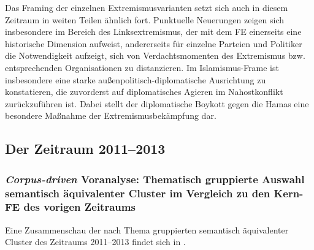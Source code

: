 Das Framing der einzelnen Extremismusvarianten setzt sich auch in diesem Zeitraum in weiten Teilen ähnlich fort. Punktuelle Neuerungen zeigen sich insbesondere im Bereich des Linksextremismus, der mit dem FE  einerseits eine historische Dimension aufweist, andererseits für einzelne Parteien und Politiker die Notwendigkeit aufzeigt, sich von Verdachtsmomenten des Extremismus bzw. entsprechenden Organisationen zu distanzieren. Im Islamismus-Frame ist insbesondere eine starke außenpolitisch-diplomatische Ausrichtung zu konstatieren, die zuvorderst auf diplomatisches Agieren im Nahostkonflikt zurückzuführen ist. Dabei stellt der diplomatische Boykott gegen die Hamas eine besondere Maßnahme der Extremismusbekämpfung dar.

\subsection{Der Zeitraum 2011--2013}\label{der-zeitraum-2011-2013}

\subsubsection{\texorpdfstring{\emph{Corpus-driven} Voranalyse: Thematisch gruppierte Auswahl semantisch äquivalenter Cluster im Vergleich zu den Kern-FE des vorigen Zeitraums}{Corpus-driven Voranalyse: Thematisch gruppierte Auswahl semantisch äquivalenter Cluster im Vergleich zu den Kern-FE des vorigen Zeitraums}}\label{corpus-driven-voranalyse-thematisch-gruppierte-auswahl-semantisch-aequivalenter-cluster-im-vergleich-zu-den-kern-fe-des-vorigen-zeitraums-3}

Eine Zusammenschau der nach Thema gruppierten semantisch äquivalenter Cluster des Zeitraums 2011--2013 findet sich in .

